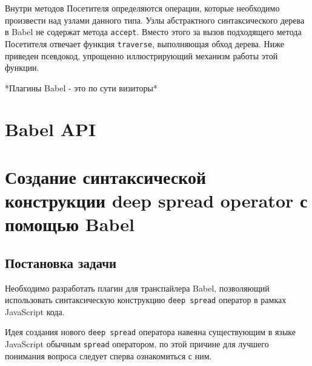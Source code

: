 \documentclass[14pt, a4paper]{article}
\def\code#1{\texttt{#1}} %
\begin{document}
Внутри методов Посетителя определяются операции, которые необходимо произвести над узлами данного типа.
Узлы абстрактного синтаксического дерева в Babel не содержат метода \code{accept}. Вместо этого за вызов
подходящего метода Посетителя отвечает функция \code{traverse}, выполняющая обход дерева. Ниже приведен 
псевдокод, упрощенно иллюстрирующий механизм работы этой функции.



 *Плагины Babel - это по сути визиторы*

\pagebreak

\section{Babel API}

\pagebreak

\section{Создание синтаксической конструкции deep spread operator с помощью Babel}
\subsection{Постановка задачи}
Необходимо разработать плагин для транспайлера Babel, позволяющий использовать синтаксическую конструкцию
\code{deep spread} оператор в рамках JavaScript кода. 

Идея создания нового \code{deep spread} оператора навеяна существующим в языке JavaScript обычным \code{spread}
оператором, по этой причине для лучшего понимания вопроса следует сперва ознакомиться с ним.
\end{document}
